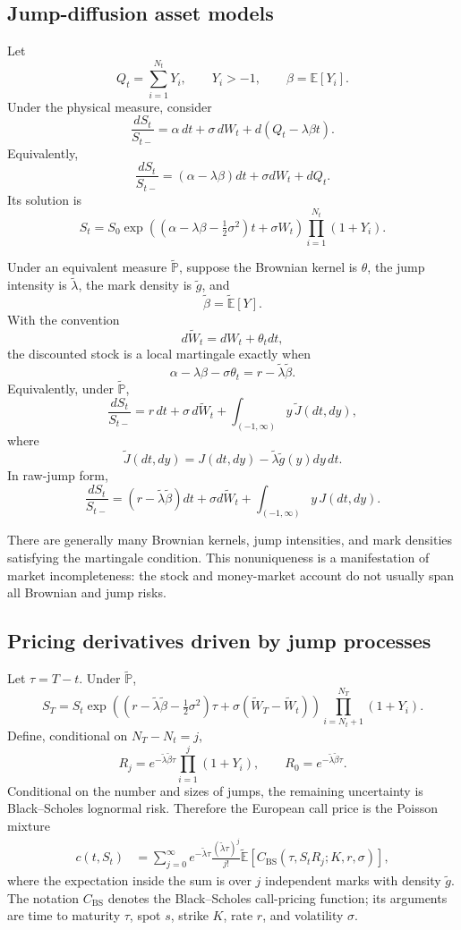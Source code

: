 \subsection{Jump-diffusion asset models}

Let
\[
Q_t=\sum_{i=1}^{N_t}Y_i,
\qquad Y_i>-1,
\qquad
\beta=\mathbb{E}[Y_i].
\]
Under the physical measure, consider
\[
\frac{dS_t}{S_{t-}}
=\alpha\,dt+\sigma\,dW_t+d(Q_t-\lambda\beta t).
\]
Equivalently,
\[
\frac{dS_t}{S_{t-}}
=(\alpha-\lambda\beta)dt+\sigma dW_t+dQ_t.
\]
Its solution is
\[
S_t
=S_0\exp\!\left(
 (\alpha-\lambda\beta-\tfrac12\sigma^2)t
 +\sigma W_t
\right)
\prod_{i=1}^{N_t}(1+Y_i).
\]

Under an equivalent measure $\widetilde{\mathbb{P}}$, suppose the Brownian kernel is $\theta$, the jump intensity is $\widetilde\lambda$, the mark density is $\widetilde g$, and
\[
\widetilde\beta
=\widetilde{\mathbb{E}}[Y].
\]
With the convention
\[
d\widetilde W_t=dW_t+\theta_tdt,
\]
the discounted stock is a local martingale exactly when
\[
\boxed{
\alpha-\lambda\beta-\sigma\theta_t
=r-\widetilde\lambda\widetilde\beta.}
\]
Equivalently, under $\widetilde{\mathbb{P}}$,
\[
\frac{dS_t}{S_{t-}}
=r\,dt+\sigma\,d\widetilde W_t
 +\int_{(-1,\infty)}y\,\widetilde J(dt,dy),
\]
where
\[
\widetilde J(dt,dy)
=J(dt,dy)-\widetilde\lambda\widetilde g(y)dy\,dt.
\]
In raw-jump form,
\[
\frac{dS_t}{S_{t-}}
=(r-\widetilde\lambda\widetilde\beta)dt
 +\sigma d\widetilde W_t
 +\int_{(-1,\infty)}y\,J(dt,dy).
\]

There are generally many Brownian kernels, jump intensities, and mark densities satisfying the martingale condition. This nonuniqueness is a manifestation of market incompleteness: the stock and money-market account do not usually span all Brownian and jump risks.

\subsection{Pricing derivatives driven by jump processes}

Let $\tau=T-t$. Under $\widetilde{\mathbb{P}}$,
\[
S_T
=S_t\exp\!\left(
(r-\widetilde\lambda\widetilde\beta-\tfrac12\sigma^2)\tau
+\sigma(\widetilde W_T-\widetilde W_t)
\right)
\prod_{i=N_t+1}^{N_T}(1+Y_i).
\]
Define, conditional on $N_T-N_t=j$,
\[
R_j
=e^{-\widetilde\lambda\widetilde\beta\tau}
 \prod_{i=1}^j(1+Y_i),
\qquad R_0=e^{-\widetilde\lambda\widetilde\beta\tau}.
\]
Conditional on the number and sizes of jumps, the remaining uncertainty is Black--Scholes lognormal risk. Therefore the European call price is the Poisson mixture
\[
\boxed{
\begin{aligned}
c(t,S_t)
&=\sum_{j=0}^{\infty}
 e^{-\widetilde\lambda\tau}
 \frac{(\widetilde\lambda\tau)^j}{j!}
 \widetilde{\mathbb{E}}\!\left[
 C_{\mathrm{BS}}(\tau,S_tR_j;K,r,\sigma)
 \right],
\end{aligned}}
\]
where the expectation inside the sum is over $j$ independent marks with density $\widetilde g$. The notation $C_{\mathrm{BS}}$ denotes the Black--Scholes call-pricing function; its arguments are time to maturity $\tau$, spot $s$, strike $K$, rate $r$, and volatility $\sigma$.

